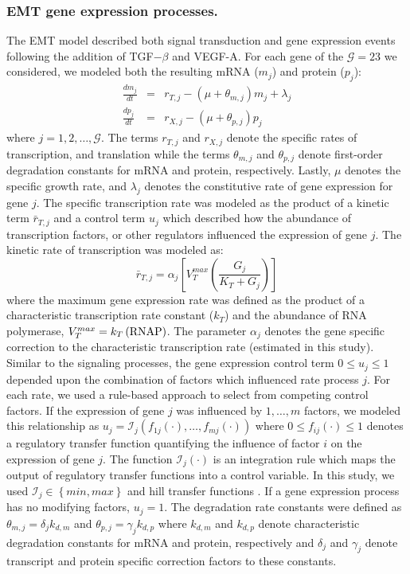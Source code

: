 \documentclass[11pt,letterpaper]{article}
\begin{document}
\subsubsection*{EMT gene expression processes.}
The EMT model described both signal transduction and gene expression events following the addition of TGF$-\beta$ and VEGF-A.
For each gene of the $\mathcal{G}=23$ we considered, we modeled both the resulting mRNA ($m_{j}$) and protein ($p_{j}$):
\begin{eqnarray}
  \frac{dm_{j}}{dt} &=& r_{T,j} - \left(\mu+\theta_{m,j}\right)m_{j}+\lambda_{j}\\
  \frac{dp_{j}}{dt} &=& r_{X,j} - \left(\mu+\theta_{p,j}\right)p_{j}
\end{eqnarray}where $j=1,2,\dots,\mathcal{G}$.
The terms $r_{T,j}$ and $r_{X,j}$ denote the specific rates of transcription, and translation while
the terms $\theta_{m,j}$ and $\theta_{p,j}$ denote first-order degradation constants for mRNA and protein, respectively.
Lastly, $\mu$ denotes the specific growth rate, and $\lambda_{j}$ denotes the constitutive rate of gene expression for gene $j$.
The specific transcription rate was modeled as the product of a kinetic term $\bar{r}_{T,j}$ and a control term $u_{j}$ which described how the
abundance of transcription factors, or other regulators influenced the expression of gene $j$.
The kinetic rate of transcription was modeled as:
\begin{equation}
  \bar{r}_{T,j} = \alpha_{j}\left[V^{max}_{T}\left(\frac{G_{j}}{K_{T}+G_{j}}\right)\right]
\end{equation}where the maximum gene expression rate was defined as the product of a characteristic transcription rate constant ($k_{T}$)
and the abundance of RNA polymerase, $V^{max}_{T} = k_{T}\left(\rm RNAP\right)$.
The parameter $\alpha_{j}$ denotes the gene specific correction to the characteristic transcription rate (estimated in this study).
Similar to the signaling processes, the gene expression control term $0\leq u_{j}\leq 1$ depended upon the combination of factors which influenced rate process $j$.
For each rate, we used a rule-based approach to select from competing control factors.
If the expression of gene $j$ was influenced by $1,\dots,m$ factors, we modeled this relationship as
$u_{j}=\mathcal{I}_{j}\left(f_{1j}\left(\cdot\right),\hdots,f_{mj}\left(\cdot\right)\right)$
where $0\leq f_{ij}\left(\cdot\right)\leq 1$ denotes a regulatory transfer function quantifying the influence of factor $i$ on the expression of gene $j$.
The function $\mathcal{I}_{j}\left(\cdot\right)$ is an integration rule which maps the output of regulatory transfer functions into a control
variable. In this study, we used $\mathcal{I}_{j}\in\left\{min,max\right\}$ and hill transfer functions \cite{pr3010178,pr3010138}.
If a gene expression process has no modifying factors, $u_{j}=1$.
The degradation rate constants were defined as $\theta_{m,j} = \delta_{j}k_{d,m}$ and $\theta_{p,j} = \gamma_{j}k_{d,p}$
where $k_{d,m}$ and $k_{d,p}$ denote characteristic degradation constants for mRNA and protein, respectively and $\delta_{j}$ and $\gamma_{j}$ denote transcript and protein specific
correction factors to these constants.
\end{document}
